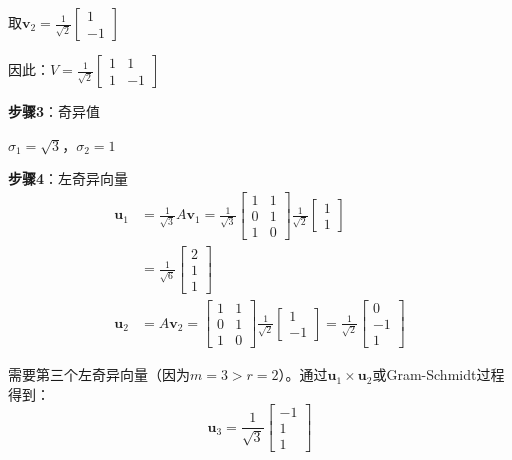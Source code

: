 \documentclass[12pt,a4paper]{article}
\begin{document}
取$\bm{v}_2 = \frac{1}{\sqrt{2}} \begin{bmatrix} 1 \\ -1 \end{bmatrix}$

因此：$V = \frac{1}{\sqrt{2}} \begin{bmatrix} 1 & 1 \\ 1 & -1 \end{bmatrix}$

\textbf{步骤3}：奇异值

$\sigma_1 = \sqrt{3}$，$\sigma_2 = 1$

\textbf{步骤4}：左奇异向量
\begin{align}
\bm{u}_1 &= \frac{1}{\sqrt{3}} A \bm{v}_1 = \frac{1}{\sqrt{3}} \begin{bmatrix} 1 & 1 \\ 0 & 1 \\ 1 & 0 \end{bmatrix} \frac{1}{\sqrt{2}} \begin{bmatrix} 1 \\ 1 \end{bmatrix} \\
&= \frac{1}{\sqrt{6}} \begin{bmatrix} 2 \\ 1 \\ 1 \end{bmatrix} \\
\bm{u}_2 &= A \bm{v}_2 = \begin{bmatrix} 1 & 1 \\ 0 & 1 \\ 1 & 0 \end{bmatrix} \frac{1}{\sqrt{2}} \begin{bmatrix} 1 \\ -1 \end{bmatrix} = \frac{1}{\sqrt{2}} \begin{bmatrix} 0 \\ -1 \\ 1 \end{bmatrix}
\end{align}

需要第三个左奇异向量（因为$m = 3 > r = 2$）。通过$\bm{u}_1 \times \bm{u}_2$或Gram-Schmidt过程得到：
\begin{equation}
\bm{u}_3 = \frac{1}{\sqrt{3}} \begin{bmatrix} -1 \\ 1 \\ 1 \end{bmatrix}
\end{equation}
\end{document}
